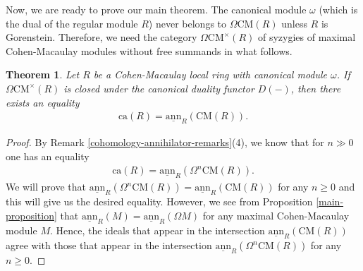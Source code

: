 \documentclass[12pt]{amsart}
\newcommand{\sann}{\underline{\mathrm{ann}}}
\newcommand\ca{\mathrm{ca}}
\newcommand{\CM}{\mathrm{CM}}
\newtheorem{theorem}{Theorem}[section]
\theoremstyle{definition}
\numberwithin{equation}{theorem}
\begin{document}
Now, we are ready to prove our main theorem. The canonical module $\omega$ (which is the dual of the regular module $R$) never belongs to $\Omega \CM(R)$ unless $R$ is Gorenstein. Therefore, we need the category $\Omega \CM^{\times}(R)$ of syzygies of maximal Cohen-Macaulay modules without free summands in what follows.
\begin{theorem}\label{main-theorem}
    Let $R$ be a Cohen-Macaulay local ring with canonical module $\omega$. If $\Omega \CM^\times(R)$ is closed under the canonical duality functor $D(-)$, then there exists an equality 
    \begin{align*}
    \ca(R) = \sann_R (\CM(R)).
    \end{align*}
\end{theorem}
\begin{proof}
    By Remark \ref{cohomology-annihilator-remarks}(4), we know that for $n \gg 0$ one has an equality 
    \begin{align*}
        \ca(R) = \sann_R(\Omega^n \CM(R)).
    \end{align*}
    We will prove that $\sann_R(\Omega^n \CM(R)) = \sann_R(\CM(R))$ for any $n \geq 0$ and this will give us the desired equality. However, we see from Proposition \ref{main-proposition} that $\sann_R(M) = \sann_R(\Omega M)$ for any maximal Cohen-Macaulay module $M$. Hence, the ideals that appear in the intersection $\sann_R(\CM(R))$ agree with those that appear in the intersection $\sann_R(\Omega^n \CM(R))$ for any $n \geq 0$.  
\end{proof}
\end{document}
